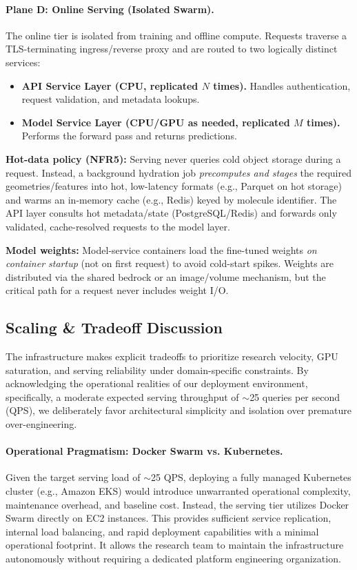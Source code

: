 \documentclass[10pt]{article}
\begin{document}
\paragraph{Plane D: Online Serving (Isolated Swarm).}
The online tier is isolated from training and offline compute. Requests traverse a TLS-terminating ingress/reverse proxy and are routed to two logically distinct services:

\begin{itemize}
\item \textbf{API Service Layer (CPU, replicated $N$ times).} Handles authentication, request validation, and metadata lookups.
\item \textbf{Model Service Layer (CPU/GPU as needed, replicated $M$ times).} Performs the forward pass and returns predictions.
\end{itemize}

\textbf{Hot-data policy (NFR5):} Serving never queries cold object storage during a request. Instead, a background hydration job \emph{precomputes and stages} the required geometries/features into hot, low-latency formats (e.g., Parquet on hot storage) and warms an in-memory cache (e.g., Redis) keyed by molecule identifier. The API layer consults hot metadata/state (PostgreSQL/Redis) and forwards only validated, cache-resolved requests to the model layer.

\textbf{Model weights:} Model-service containers load the fine-tuned weights \emph{on container startup} (not on first request) to avoid cold-start spikes. Weights are distributed via the shared bedrock or an image/volume mechanism, but the critical path for a request never includes weight I/O.




\subsection{Scaling \& Tradeoff Discussion}
\label{subsection:scaling-discussion}

The infrastructure makes explicit tradeoffs to prioritize research velocity, GPU saturation, and serving reliability under domain-specific constraints. By acknowledging the operational realities of our deployment environment, specifically, a moderate expected serving throughput of $\sim$25 queries per second (QPS), we deliberately favor architectural simplicity and isolation over premature over-engineering.

\paragraph{Operational Pragmatism: Docker Swarm vs. Kubernetes.}
Given the target serving load of $\sim$25 QPS, deploying a fully managed Kubernetes cluster (e.g., Amazon EKS) would introduce unwarranted operational complexity, maintenance overhead, and baseline cost. Instead, the serving tier utilizes Docker Swarm directly on EC2 instances. This provides sufficient service replication, internal load balancing, and rapid deployment capabilities with a minimal operational footprint. It allows the research team to maintain the infrastructure autonomously without requiring a dedicated platform engineering organization.
\end{document}

